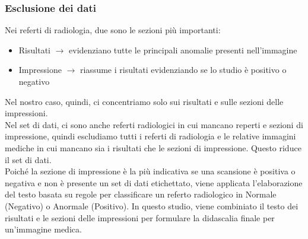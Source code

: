 \documentclass[12pt,a4paper]{report}
\begin{document}
\subsubsection{Esclusione dei dati}
Nei referti di radiologia, due sono le sezioni più importanti:
\begin{itemize}
    \item Risultati $\rightarrow$ evidenziano tutte le principali anomalie presenti nell'immagine
    \item Impressione $\rightarrow$ riassume i risultati evidenziando se lo studio è positivo o negativo
\end{itemize}
Nel nostro caso, quindi, ci concentriamo solo sui risultati e sulle sezioni delle impressioni.\\
Nel set di dati, ci sono anche referti radiologici in cui mancano reperti e sezioni di impressione, quindi escludiamo tutti i referti di radiologia e le relative immagini mediche in cui mancano sia i risultati che le sezioni di impressione.
Questo riduce il set di dati.\\
Poiché la sezione di impressione è la più indicativa se una scansione è positiva o negativa e non è presente un set di dati etichettato, viene applicata l'elaborazione del testo basata su regole per classificare un referto radiologico in Normale (Negativo) o Anormale (Positivo).
In questo studio, viene combiniato il testo dei risultati e le sezioni delle impressioni per formulare la didascalia finale per un'immagine medica.
\end{document}
